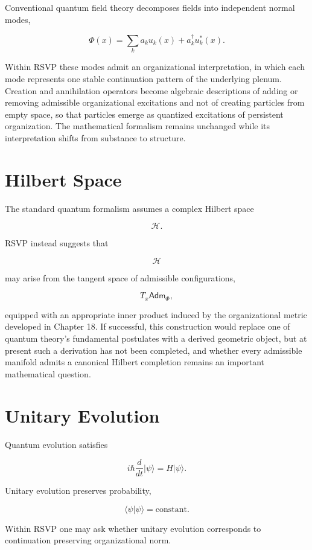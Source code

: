 \documentclass[11pt,oneside]{book}
\numberwithin{equation}{chapter}
\theoremstyle{definition}
\theoremstyle{plain}
\newcommand{\Adm}{\mathsf{Adm}}
\begin{document}
Conventional quantum field theory decomposes fields into independent normal
modes,

\[
\Phi(x)
=
\sum_k
a_k
u_k(x)
+
a_k^\dagger
u_k^*(x).
\]

Within RSVP these modes admit an organizational interpretation, in which each mode represents one stable continuation pattern of the underlying plenum. Creation and annihilation operators become algebraic descriptions of adding or removing admissible organizational excitations and not of creating particles from empty space, so that particles emerge as quantized excitations of persistent organization. The mathematical formalism remains unchanged while its interpretation shifts from substance to structure.

\section{Hilbert Space}

The standard quantum formalism assumes a complex Hilbert space

\[
\mathcal H.
\]

RSVP instead suggests that

\[
\mathcal H
\]

may arise from the tangent space of admissible configurations,

\[
T_x
\Adm_\Phi,
\]

equipped with an appropriate inner product induced by the organizational metric developed in Chapter 18. If successful, this construction would replace one of quantum theory's fundamental postulates with a derived geometric object, but at present such a derivation has not been completed, and whether every admissible manifold admits a canonical Hilbert completion remains an important mathematical question.

\section{Unitary Evolution}

Quantum evolution satisfies

\[
i
\hbar
\frac{d}{dt}
|\psi\rangle
=
H
|\psi\rangle.
\]

Unitary evolution preserves probability,

\[
\langle\psi|\psi\rangle
=
\text{constant}.
\]

Within RSVP one may ask whether unitary evolution corresponds to
continuation preserving organizational norm.
\end{document}
